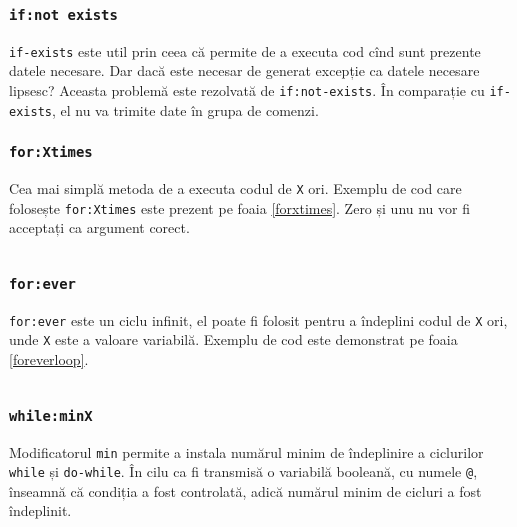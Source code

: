 \subsubsection{\texttt{if:not exists}}

\texttt{if-exists} este util prin ceea că permite de a executa cod cînd sunt prezente datele necesare. Dar dacă este necesar de generat excepție ca datele necesare lipsesc? Aceasta problemă este rezolvată de \texttt{if:not-exists}. În comparație cu \texttt{if-exists}, el nu va trimite date în grupa de comenzi.

\subsubsection{\texttt{for:Xtimes}}

Cea mai simplă metoda de a executa codul de \texttt{X} ori. Exemplu de cod care folosește \texttt{for:Xtimes} este prezent pe foaia \ref{forxtimes}. Zero și unu nu vor fi acceptați ca argument corect.

\begin{sourcecode}
    \label{forxtimes}
    \inputminted[linenos]{icl}{../sources/forxtimes.icL}
\end{sourcecode}

\subsubsection{\texttt{for:ever}}

\texttt{for:ever} este un ciclu infinit, el poate fi folosit pentru a îndeplini codul de \texttt{X} ori, unde \texttt{X} este a valoare variabilă. Exemplu de cod este demonstrat pe foaia \ref{foreverloop}.

\begin{sourcecode}
    \label{foreverloop}
    \inputminted[linenos]{icl}{../sources/foreverloop.icL}
\end{sourcecode}

\subsubsection{\texttt{while:minX}}

Modificatorul \texttt{min} permite a instala numărul minim de îndeplinire a ciclurilor \texttt{while} și \texttt{do-while}. În cilu ca fi transmisă o variabilă booleană, cu numele \texttt{@}, \true{} înseamnă că condiția a fost controlată, adică numărul minim de cicluri a fost îndeplinit.

